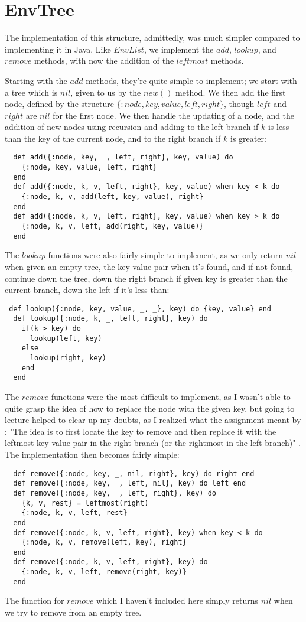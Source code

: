 \documentclass[a4paper,11pt]{article}
\begin{document}
\section*{EnvTree}
The implementation of this structure, admittedly, was much simpler compared to implementing it in Java. Like $EnvList$, we implement the $add$, $lookup$, and $remove$ methods, with now the addition of the $leftmost$ methods.

Starting with the $add$ methods, they're quite simple to implement; we start with a tree which is $nil$, given to us by the $new()$ method. We then add the first node, defined by the structure $\{:node, key, value, left, right\}$, though $left$ and $right$ are $nil$ for the first node. We then handle the updating of a node, and the addition of new nodes using recursion and adding to the left branch if $k$ is less than the key of the current node, and to the right branch if $k$ is greater:
\begin{verbatim}
  def add({:node, key, _, left, right}, key, value) do 
    {:node, key, value, left, right}
  end
  def add({:node, k, v, left, right}, key, value) when key < k do
    {:node, k, v, add(left, key, value), right}
  end
  def add({:node, k, v, left, right}, key, value) when key > k do
    {:node, k, v, left, add(right, key, value)}
  end
\end{verbatim} 

The $lookup$ functions were also fairly simple to implement, as we only return $nil$ when given an empty tree, the key value pair when it's found, and if not found, continue down the tree, down the right branch if given key is greater than the current branch, down the left if it's less than: 

\begin{verbatim}
 def lookup({:node, key, value, _, _}, key) do {key, value} end
  def lookup({:node, k, _, left, right}, key) do
    if(k > key) do
      lookup(left, key)
    else
      lookup(right, key)
    end
  end
\end{verbatim} 

The $remove$ functions were the most difficult to implement, as I wasn't able to quite grasp the idea of how to replace the node with the given key, but going to lecture helped to clear up my doubts, as I realized what the assignment meant by : "The idea is to first locate the key to remove and then replace it with the leftmost key-value pair in the right branch (or the rightmost in the left branch)" . The implementation then becomes fairly simple: 
\begin{verbatim}
  def remove({:node, key, _, nil, right}, key) do right end
  def remove({:node, key, _, left, nil}, key) do left end
  def remove({:node, key, _, left, right}, key) do
    {k, v, rest} = leftmost(right)
    {:node, k, v, left, rest}
  end
  def remove({:node, k, v, left, right}, key) when key < k do
    {:node, k, v, remove(left, key), right}
  end
  def remove({:node, k, v, left, right}, key) do
    {:node, k, v, left, remove(right, key)}
  end
\end{verbatim} 
The function for $remove$ which I haven't included here simply returns $nil$ when we try to remove from an empty tree.
\end{document}
